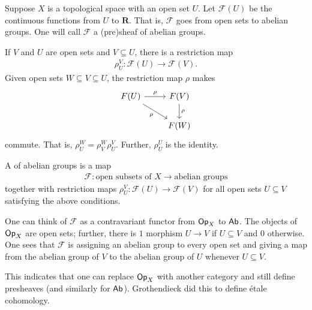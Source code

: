 \documentclass [11 pt, oneside] {article}
\begin{document}
\begin{example}[Motivation]\label{}\text{}
Suppose $X$ is a topological space with an open set $U$. Let $\mathscr{F}(U)$ be the continuous functions from $U$ to $\mathbf{R}$. That is, $\mathscr{F}$ goes from open sets to abelian groups. One will call $\mathscr{F}$ a (pre)sheaf of abelian groups. 

If $V$ and $U$ are open sets and $V\subseteq U$, there is a restriction map
\begin{align*}
	\rho_{U}^V : \mathscr{F}(U)  \longrightarrow \mathscr{F}(V).
\end{align*}
Given open sets $W\subseteq V\subseteq U$, the restriction map $\rho$ makes
\[
\begin{tikzcd}
	\mathscr{F}(U)\ar[r,"\rho"] \ar[dr,"\rho", swap] &  \mathscr{F}(V)\ar[d,"\rho"] \\
						   & \mathscr{F}(W)
\end{tikzcd}
\]
commute. That is, $\rho_{U}^W = \rho_{V}^W \rho_{U}^V$. Further, $\rho_{U}^U$ is the identity.

A  of abelian groups is a map
\begin{align*}
	\mathscr{F} : \textrm{open subsets of $X$} \longrightarrow \textrm{abelian groups}
\end{align*}
together with restriction maps $\rho_{U}^V : \mathscr{F}(U) \longrightarrow  \mathscr{F}(V)$ for all open sets $U\subseteq V$ satisfying the above conditions. 
\end{example}

One can think of $\mathscr{F}$ as a contravariant functor from $\textsf{Op}_X$ to $\textsf{Ab}$. The objects of $\textsf{Op}_X$ are open sets; further, there is $1$ morphism $U\longrightarrow V$ if $U\subseteq V$ and $0$ otherwise. One sees that $\mathscr{F}$ is assigning an abelian group to every open set and giving a map from the abelian group of $V$ to the abelian group of $U$ whenever $U\subseteq V$.

\begin{remark}
	This indicates that one can replace $\textsf{Op}_X$ with another category and still define presheaves (and similarly for $\textsf{Ab}$). Grothendieck did this to define \'etale cohomology.
\end{remark}
\end{document}
